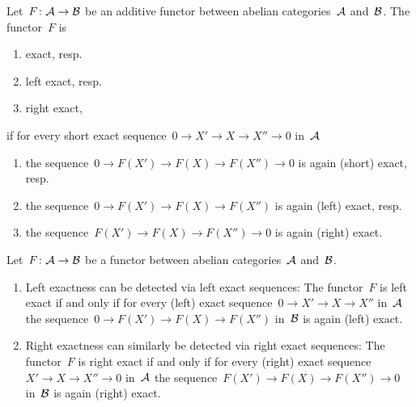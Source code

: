 \begin{definition}
  Let~$F \colon \mathcal{A} \to \mathcal{B}$ be an additive functor between abelian categories~$\mathcal{A}$ and~$\mathcal{B}$.
  The functor~$F$ is
  \begin{enumerate}
    \item
      exact, resp.
    \item
      left exact, resp.
    \item
      right exact,
  \end{enumerate}
  if for every short exact sequence~$0 \to X' \to X \to X'' \to 0$ in~$\mathcal{A}$
  \begin{enumerate}
    \item
      the sequence~$0 \to F(X') \to F(X) \to F(X'') \to 0$ is again (short) exact, resp.
    \item
     the sequence~$0 \to F(X') \to F(X) \to F(X'')$ is again (left) exact, resp.
    \item
      the sequence~$F(X') \to F(X) \to F(X'') \to 0$ is again (right) exact.
  \end{enumerate}
\end{definition}


\begin{remark}
  Let~$F \colon \mathcal{A} \to \mathcal{B}$ be a functor between abelian categories~$\mathcal{A}$ and~$\mathcal{B}$.
  \begin{enumerate}
    \item
      Left exactness can be detected via left exact sequences:
      The functor~$F$ is left exact if and only if for every (left) exact sequence~$0 \to X' \to X \to X''$ in~$\mathcal{A}$ the sequence~$0 \to F(X') \to F(X) \to F(X'')$ in~$\mathcal{B}$ is again (left) exact.
    \item
      Right exactness can similarly be detected via right exact sequences:
      The functor~$F$ is right exact if and only if for every (right) exact sequence~$X' \to X \to X'' \to 0$ in~$\mathcal{A}$ the sequence~$F(X') \to F(X) \to F(X'') \to 0$ in~$\mathcal{B}$ is again (right) exact.
  \end{enumerate}
\end{remark}




